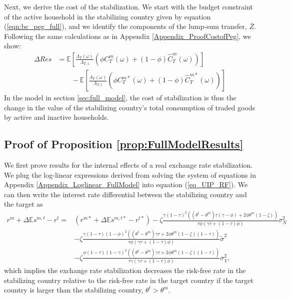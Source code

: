 Next, we derive the cost of the stabilization. We start with the
budget constraint of the active household in the stabilizing country
given by equation (\ref{eqn:bc_peg_full}), and we identify the
components of the lump-sum transfer, $\bar{Z}$. Following the same
calculations as in Appendix \ref{Appendix_ProofCostofPeg}, we show:
\begin{equation}
  \begin{split}
    \Delta Res & = \mathbb{E}\left[
      \frac{\Lambda_T(\omega)}{\Lambda_{T, 1}} \left( \phi
        C_T^m(\omega) + (1 - \phi) \hat{C}_T^m(\omega) \right)
    \right] \\
    & \quad \quad - \mathbb{E}\left[
      \frac{\Lambda_T(\omega)}{\Lambda_{T, 1}} \left( \phi C_T^{m
          \ast}(\omega) + (1 - \phi) \hat{C}_T^{m \ast}(\omega)
      \right) \right]
  \end{split}
  \label{eqn:delta_res_full}
\end{equation}
In the model in section \ref{sec:full_model}, the cost of
stabilization is thus the change in the value of the stabilizing
country's total consumption of traded goods by active and inactive
households.


\subsection{Proof of Proposition \ref{prop:FullModelResults}
  \label{Appendix_FullModelProof}}

We first prove results for the internal effects of a real exchange
rate stabilization. We plug the log-linear expressions derived from
solving the system of equations in Appendix
\ref{Appendix_Loglinear_FullModel} into equation (\ref{eq_UIP_RF}). We
can then write the interest rate differential between the stabilizing
country and the target as
\begin{align*}
  r^m + \Delta \mathbb{E}s^{m, t} - r^t =
  & \left(r^{m \ast} + \Delta \mathbb{E}s^{m, t \ast} - r^{t \ast} \right) -
    \zeta \frac{\gamma (1 - \tau)^2\left( (\theta^t - \theta^m) \tau (\gamma - \phi) + 2 \phi \theta^m (1 - \zeta) \right)}{\tau \phi \left( \gamma \tau + (1 - \tau) \phi \right)} \sigma_N^2 \\
  & - \zeta \frac{\gamma (1 - \tau)(1 - \phi)^2\left( (\theta^t - \theta^m) \gamma \tau + 2 \phi \theta^m (1 - \zeta) (1 - \tau) \right)}{\tau \phi \left( \gamma \tau + (1 - \tau) \phi \right)} \tilde{\sigma}^2 \\
  & - \zeta \frac{\phi (1 - \tau)(1 - \gamma)^2\left( (\theta^t - \theta^m) \gamma \tau + 2 \phi \theta^m (1 - \zeta) (1 - \tau) \right)}{\tau \gamma \left( \gamma \tau + (1 - \tau) \phi \right)} \sigma_{\chi}^2,
\end{align*}
which implies the exchange rate stabilization decreases the risk-free
rate in the stabilizing country relative to the risk-free rate in the
target country if the target country is larger than the stabilizing
country, $\theta^t > \theta^m$.

